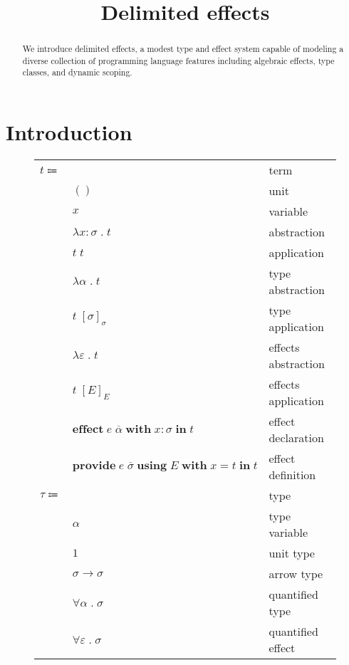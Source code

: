 \documentclass[12pt]{article}
\title{Delimited effects}
\date{}
\newcommand\lstof[1]{\overline{#1}}
\newcommand\eterm{t}
\newcommand\eunit{()}
\newcommand\evar{x}
\newcommand\eabs[2]{\lambda #1 \; . \; #2} %
\newcommand\eapp[2]{#1 \; #2}
\newcommand\eeffect[4]{\textbf{effect} \; #1 \; \textbf{with} \; \tanno{#2}{#3} \; \textbf{in} \; #4}
\newcommand\eprovide[5]{\textbf{provide} \; #1 \; \textbf{using} \; #2 \; \textbf{with} \; #3 = #4 \; \textbf{in} \; #5}
\newcommand\etabs[2]{\lambda #1 \; . \; #2} %
\newcommand\exabs[2]{\lambda #1 \; . \; #2} %
\newcommand\etapp[2]{#1 \; \left[#2\right]_{\tx}}
\newcommand\exapp[2]{#1 \; \left[#2\right]_{\xeffects}}
\newcommand\ttype{\tau}
\newcommand\tunit{1}
\newcommand\tvar{\alpha}
\newcommand\tarrow[2]{#1 \rightarrow #2} %
\newcommand\tanno[2]{#1 : #2} %
\newcommand\tx{\sigma}
\newcommand\tforall[2]{\forall #1 \; . \; #2} %
\newcommand\xeffect{e}
\newcommand\xtapp[2]{#1 \; \lstof{#2}}
\newcommand\xvar{\varepsilon}
\newcommand\xeffects{E}
\newcommand\xforall[2]{\forall #1 \; . \; #2} %
\begin{document}
  \maketitle

  \begin{abstract}
    We introduce delimited effects, a modest type and effect system capable of modeling a diverse collection of programming language features including algebraic effects, type classes, and dynamic scoping.
  \end{abstract}

  \section{Introduction}

  \begin{figure}
    \begin{mdframed}[backgroundcolor=none]
      \begin{center}
        \begin{tabular}{l l l}
          $\eterm \Coloneqq $ & & term \\
          & $\eunit$ & unit \\
          & $\evar$ & variable \\
          & $\eabs{\tanno{\evar}{\tx}}{\eterm}$ & abstraction \\
          & $\eapp{\eterm}{\eterm}$ & application \\
          & $\etabs{\tvar}{\eterm}$ & type abstraction \\
          & $\etapp{\eterm}{\tx}$ & type application \\
          & $\exabs{\xvar}{\eterm}$ & effects abstraction \\
          & $\exapp{\eterm}{\xeffects}$ & effects application \\
          & $\eeffect{\xtapp{\xeffect}{\tvar}}{\evar}{\tx}{\eterm}$ & effect declaration \\
          & $\eprovide{\xtapp{\xeffect}{\tx}}{\xeffects}{\evar}{\eterm}{\eterm}$ & effect definition \\
          $\ttype \Coloneqq$ & & type \\
          & $\tvar$ & type variable \\
          & $\tunit$ & unit type \\
          & $\tarrow{\tx}{\tx}$ & arrow type \\
          & $\tforall{\tvar}{\tx}$ & quantified type \\
          & $\xforall{\xvar}{\tx}$ & quantified effect \\

\end{tabular}
\end{center}
\end{mdframed}
\end{figure}
\end{document}
